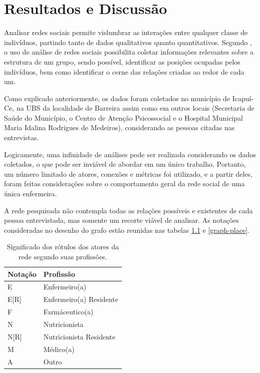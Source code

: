 \chapter{Resultados e Discussão}
\label{chap:resultados}

Analisar redes sociais permite vislumbrar as interações entre qualquer classe de indivíduos, partindo tanto de dados qualitativos quanto quantitativos. Segundo \cite{stanley1994social},  o uso de  análise de redes sociais possibilita coletar informações relevantes sobre a estrutura de um grupo, sendo possível, identificar as posições ocupadas pelos indivíduos, bem como identificar o cerne das relações criadas ao redor de cada um.

Como explicado anteriormente, os dados foram coletados no município de Icapuí-Ce, na \acrlong{UBS} da localidade de Barreira assim como em outros locais (Secretaria de Saúde do Município, o Centro de Atenção Psicossocial e o Hospital Municipal Maria Idalina Rodrigues de Medeiros), considerando as pessoas citadas nas entrevistas.

Logicamente, uma infinidade de análises pode ser realizada considerando os dados coletados, o que pode ser inviável de abordar em um único trabalho. Portanto, um número limitado de atores, conexões e métricas foi utilizado, e a partir deles, foram feitas considerações sobre o comportamento geral da rede social de uma única enfermeira. 

A rede pesquisada não contempla todas as relações possíveis e existentes de cada pessoa entrevistada, mas somente um recorte viável de analisar. As notações consideradas no desenho do grafo estão reunidas nas tabelas \ref{graph-job} e \ref{graph-place}.

\begin{table}[htbp]
\centering
\caption{Significado dos rótulos dos atores da rede segundo suas profissões.}
\label{graph-job}
\begin{tabular}{|l|l|}
\hline
Notação  & Profissão               \\ \hline
E        & Enfermeiro(a)           \\ \hline
E{[}R{]} & Enfermeiro(a) Residente \\ \hline
F        & Farmáceutico(a)         \\ \hline
N        & Nutricionista           \\ \hline
N{[}R{]} & Nutricionista Residente \\ \hline
M        & Médico(a)               \\ \hline
A        & Outro                   \\ \hline
\end{tabular}
\end{table}

